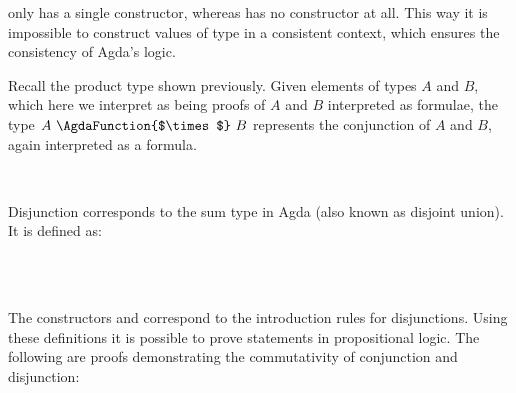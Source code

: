 \documentclass[12pt,a4paper,twoside,openright]{report}
\newcommand{\C}{\AgdaInductiveConstructor}
\newcommand{\F}{\AgdaFunction}
\begin{document}
\F{$\top$} only has a single constructor, whereas \F{$\bot$} has no constructor at all. This way it is impossible to construct values of type \F{$\bot$} in a consistent context, which ensures the consistency of Agda's logic.

Recall the product type \F{$\_\!\!\times\!\!\_$} shown previously. Given elements of types $A$ and $B$, which here we interpret as being proofs of $A$ and $B$ interpreted as formulae, the type $A\ \F{$\times$}\ B$ represents the conjunction of $A$ and $B$, again interpreted as a formula.

\begin{code}
\> \AgdaSymbol{:} \AgdaSymbol{\{}  \AgdaSymbol{:} \AgdaSymbol{\}}        \<%
\\
\>   \AgdaSymbol{=}  \AgdaInductiveConstructor{,} \<%
\end{code}

Disjunction corresponds to the sum type in Agda (also known as disjoint union). It is defined as:

\begin{code}
\>  \AgdaSymbol{(}  \AgdaSymbol{:} \AgdaSymbol{)} \AgdaSymbol{:}  \<%
\\
\>[0]\<[2]%
\>[2] \AgdaSymbol{:}     \<%
\\
\>[0]\<[2]%
\>[2] \AgdaSymbol{:}     \<%
\end{code}

The constructors \C{inj$_1$} and \C{inj$_2$} correspond to the introduction rules for disjunctions.  
Using these definitions it is possible to prove statements in propositional logic. The following are proofs demonstrating the commutativity of conjunction and disjunction:
\end{document}
